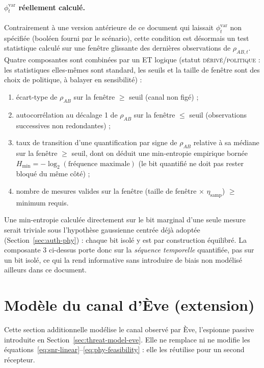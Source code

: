 \documentclass[conference,a4paper]{IEEEtran}
\newcommand{\statusDer}{\textsc{dérivé}}
\newcommand{\statusPol}{\textsc{politique}}
\begin{document}
\paragraph{$\phi_t^{\mathrm{var}}$ réellement calculé.} Contrairement à une version antérieure de ce document qui laissait $\phi_t^{\mathrm{var}}$ non spécifiée (booléen fourni par le scénario), cette condition est désormais un test statistique calculé sur une fenêtre glissante des dernières observations de $\rho_{AB,t}$. Quatre composantes sont combinées par un ET logique (statut \statusDer{}/\statusPol{} : les statistiques elles-mêmes sont standard, les seuils et la taille de fenêtre sont des choix de politique, à balayer en sensibilité) :
\begin{enumerate}
    \item écart-type de $\rho_{AB}$ sur la fenêtre $\geq$ seuil (canal non figé) ;
    \item autocorrélation au décalage 1 de $\rho_{AB}$ sur la fenêtre $\leq$ seuil (observations successives non redondantes) ;
    \item taux de transition d'une quantification par signe de $\rho_{AB}$ relative à sa médiane sur la fenêtre $\geq$ seuil, dont on déduit une min-entropie empirique bornée $H_{\min}=-\log_2(\text{fréquence maximale})$ (le bit quantifié ne doit pas rester bloqué du même côté) ;
    \item nombre de mesures valides sur la fenêtre (taille de fenêtre $\times$ $\eta_{\mathrm{samp}}$) $\geq$ minimum requis.
\end{enumerate}
Une min-entropie calculée directement sur le bit marginal d'une seule mesure serait triviale sous l'hypothèse gaussienne centrée déjà adoptée (Section~\ref{sec:auth-phy}) : chaque bit isolé y est par construction équilibré. La composante 3 ci-dessus porte donc sur la \emph{séquence temporelle} quantifiée, pas sur un bit isolé, ce qui la rend informative sans introduire de biais non modélisé ailleurs dans ce document.

\section{Modèle du canal d'Ève (extension)}
\label{sec:eve-model}

Cette section additionnelle modélise le canal observé par Ève, l'espionne passive introduite en Section~\ref{sec:threat-model-eve}. Elle ne remplace ni ne modifie les équations~\eqref{eq:snr-linear}--\eqref{eq:phy-feasibility} : elle les réutilise pour un second récepteur.
\end{document}
